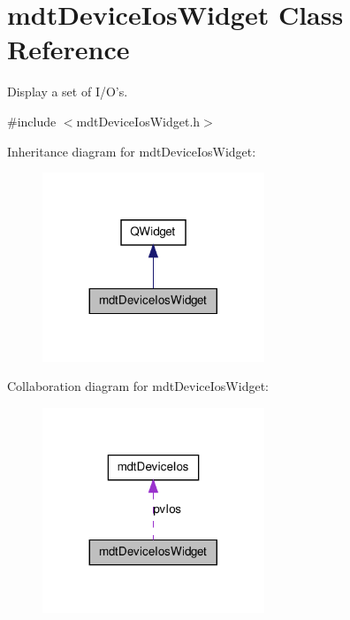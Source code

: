 \hypertarget{classmdt_device_ios_widget}{\section{mdt\-Device\-Ios\-Widget Class Reference}
\label{classmdt_device_ios_widget}
}


Display a set of I/\-O's.  




{\ttfamily \#include $<$mdt\-Device\-Ios\-Widget.\-h$>$}



Inheritance diagram for mdt\-Device\-Ios\-Widget\-:\nopagebreak
\begin{figure}[H]
\begin{center}
\leavevmode
\includegraphics[width=188pt]{classmdt_device_ios_widget__inherit__graph}
\end{center}
\end{figure}


Collaboration diagram for mdt\-Device\-Ios\-Widget\-:\nopagebreak
\begin{figure}[H]
\begin{center}
\leavevmode
\includegraphics[width=188pt]{classmdt_device_ios_widget__coll__graph}
\end{center}
\end{figure}
